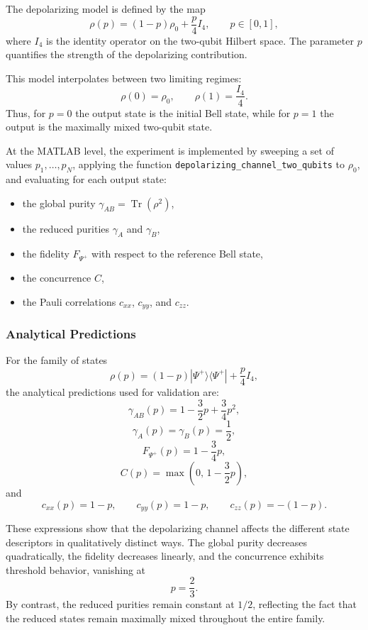 \documentclass[a4paper]{article}
\begin{document}
The depolarizing model is defined by the map
\[
\rho(p) = (1-p)\rho_0 + \frac{p}{4}I_4,
\qquad p \in [0,1],
\]
where \(I_4\) is the identity operator on the two-qubit Hilbert space. The parameter \(p\) quantifies the strength of the depolarizing contribution.

This model interpolates between two limiting regimes:
\[
\rho(0)=\rho_0,
\qquad
\rho(1)=\frac{I_4}{4}.
\]
Thus, for \(p=0\) the output state is the initial Bell state, while for \(p=1\) the output is the maximally mixed two-qubit state.

At the MATLAB level, the experiment is implemented by sweeping a set of values \(p_1,\dots,p_N\), applying the function \texttt{depolarizing\_channel\_two\_qubits} to \(\rho_0\), and evaluating for each output state:
\begin{itemize}
    \item the global purity \(\gamma_{AB} = \operatorname{Tr}(\rho^2)\),
    \item the reduced purities \(\gamma_A\) and \(\gamma_B\),
    \item the fidelity \(F_{\Psi^+}\) with respect to the reference Bell state,
    \item the concurrence \(C\),
    \item the Pauli correlations \(c_{xx}\), \(c_{yy}\), and \(c_{zz}\).
\end{itemize}

\subsubsection{Analytical Predictions}

For the family of states
\[
\rho(p) = (1-p)|\Psi^+\rangle\langle\Psi^+| + \frac{p}{4}I_4,
\]
the analytical predictions used for validation are:
\[
\gamma_{AB}(p)=1-\frac{3}{2}p+\frac{3}{4}p^2,
\]
\[
\gamma_A(p)=\gamma_B(p)=\frac{1}{2},
\]
\[
F_{\Psi^+}(p)=1-\frac{3}{4}p,
\]
\[
C(p)=\max\left(0,\,1-\frac{3}{2}p\right),
\]
and
\[
c_{xx}(p)=1-p,\qquad
c_{yy}(p)=1-p,\qquad
c_{zz}(p)=-(1-p).
\]

These expressions show that the depolarizing channel affects the different state descriptors in qualitatively distinct ways. The global purity decreases quadratically, the fidelity decreases linearly, and the concurrence exhibits threshold behavior, vanishing at
\[
p=\frac{2}{3}.
\]
By contrast, the reduced purities remain constant at \(1/2\), reflecting the fact that the reduced states remain maximally mixed throughout the entire family.
\end{document}
